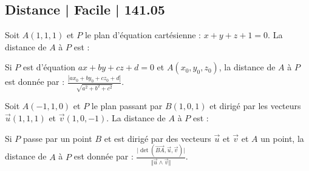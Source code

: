 \subsection{Distance | Facile | 141.05}

\begin{question} 
Soit $A(1,1,1)$ et $P$ le plan d'équation cartésienne : $x+y+z+1=0$. La distance de $A$ à $P$ est : 
\begin{answers}


 
   
    
     
   
\end{answers}
\begin{explanations}
Si $P$ est d'équation  $ax+by+cz+d=0$ et $A(x_0,y_0,z_0)$, la distance de $A$ à $P$ est donnée par : $\frac{|ax_0+by_0+cz_0+d|}{\sqrt{a^2+b^2+c^2}}$.
\end{explanations}

\end{question}


\begin{question} 
Soit $A(-1,1,0)$ et $P$ le plan passant par $B(1,0,1)$ et dirigé par les vecteurs $\vec{u}(1,1,1)$ et $\vec{v}(1,0,-1)$. La distance de $A$ à $P$ est : 
\begin{answers}


 
   
    
     
   
\end{answers}
\begin{explanations}
Si $P$ passe par un point $B$ et est dirigé par des vecteurs $\vec{u}$ et $\vec{v}$ et $A$ un point, la distance de $A$ à $P$ est donnée par : $\frac{ \vert \det (\overrightarrow{BA}, \vec{u},\vec{v})\vert}{\Vert \vec{u} \wedge \vec{v}\Vert}$.
\end{explanations}

\end{question}


